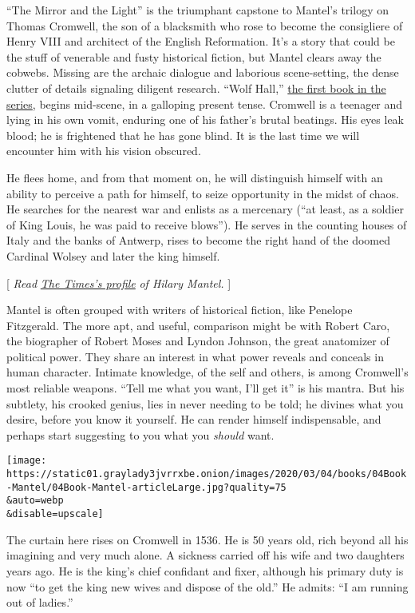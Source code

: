 ``The Mirror and the Light'' is the triumphant capstone to Mantel's
trilogy on Thomas Cromwell, the son of a blacksmith who rose to become
the consigliere of Henry VIII and architect of the English Reformation.
It's a story that could be the stuff of venerable and fusty historical
fiction, but Mantel clears away the cobwebs. Missing are the archaic
dialogue and laborious scene-setting, the dense clutter of details
signaling diligent research. ``Wolf Hall,''
\href{https://www.nytimes3xbfgragh.onion/2009/10/05/books/05maslin.html}{the
first book in the series}, begins mid-scene, in a galloping present
tense. Cromwell is a teenager and lying in his own vomit, enduring one
of his father's brutal beatings. His eyes leak blood; he is frightened
that he has gone blind. It is the last time we will encounter him with
his vision obscured.

He flees home, and from that moment on, he will distinguish himself with
an ability to perceive a path for himself, to seize opportunity in the
midst of chaos. He searches for the nearest war and enlists as a
mercenary (``at least, as a soldier of King Louis, he was paid to
receive blows''). He serves in the counting houses of Italy and the
banks of Antwerp, rises to become the right hand of the doomed Cardinal
Wolsey and later the king himself.

{[} \emph{Read}
\href{https://www.nytimes3xbfgragh.onion/2020/02/24/books/hilary-mantel-mirror-and-the-light-thomas-cromwell.html}{\emph{The
Times's profile}} \emph{of Hilary Mantel.} {]}

Mantel is often grouped with writers of historical fiction, like
Penelope Fitzgerald. The more apt, and useful, comparison might be with
Robert Caro, the biographer of Robert Moses and Lyndon Johnson, the
great anatomizer of political power. They share an interest in what
power reveals and conceals in human character. Intimate knowledge, of
the self and others, is among Cromwell's most reliable weapons. ``Tell
me what you want, I'll get it'' is his mantra. But his subtlety, his
crooked genius, lies in never needing to be told; he divines what you
desire, before you know it yourself. He can render himself
indispensable, and perhaps start suggesting to you what you
\emph{should} want.

\texttt{[image: https://static01.graylady3jvrrxbe.onion/images/2020/03/04/books/04Book-Mantel/04Book-Mantel-articleLarge.jpg?quality=75\\\&auto=webp\\\&disable=upscale]}

The curtain here rises on Cromwell in 1536. He is 50 years old, rich
beyond all his imagining and very much alone. A sickness carried off his
wife and two daughters years ago. He is the king's chief confidant and
fixer, although his primary duty is now ``to get the king new wives and
dispose of the old.'' He admits: ``I am running out of ladies.''


